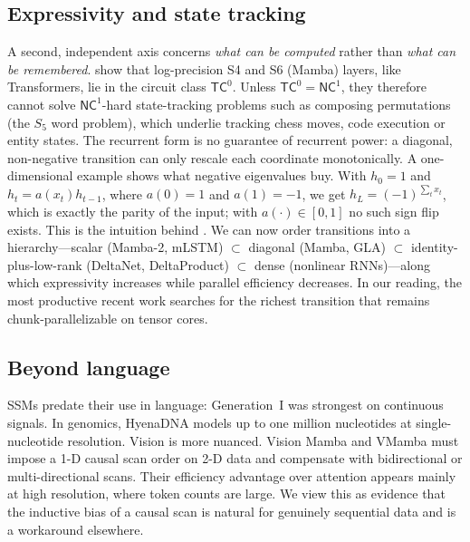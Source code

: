 \documentclass[a4paper]{article}
\theoremstyle{plain}
\theoremstyle{remark}
\begin{document}
\subsection{Expressivity and state tracking}
\label{sec:expressivity}
A second, independent axis concerns \emph{what can be computed} rather than \emph{what can be remembered}. \citet{merrill2024illusion} show that log-precision S4 and S6 (Mamba) layers, like Transformers, lie in the circuit class $\mathsf{TC}^0$. Unless $\mathsf{TC}^0=\mathsf{NC}^1$, they therefore cannot solve $\mathsf{NC}^1$-hard state-tracking problems such as composing permutations (the $S_5$ word problem), which underlie tracking chess moves, code execution or entity states. The recurrent form is no guarantee of recurrent power: a diagonal, non-negative transition can only rescale each coordinate monotonically. A one-dimensional example shows what negative eigenvalues buy. With $h_0=1$ and $h_t=a(x_t)h_{t-1}$, where $a(0)=1$ and $a(1)=-1$, we get $h_L=(-1)^{\sum_tx_t}$, which is exactly the parity of the input; with $a(\cdot)\in[0,1]$ no such sign flip exists. This is the intuition behind \citet{grazzi2025negative}. We can now order transitions into a hierarchy---scalar (Mamba-2, mLSTM) $\subset$ diagonal (Mamba, GLA) $\subset$ identity-plus-low-rank (DeltaNet, DeltaProduct) $\subset$ dense (nonlinear RNNs)---along which expressivity increases while parallel efficiency decreases. In our reading, the most productive recent work searches for the richest transition that remains chunk-parallelizable on tensor cores.

\subsection{Beyond language}
\label{sec:beyond}
SSMs predate their use in language: Generation~I was strongest on continuous signals. In genomics, HyenaDNA \citep{nguyen2023hyenadna} models up to one million nucleotides at single-nucleotide resolution. Vision is more nuanced. Vision Mamba \citep{zhu2024vim} and VMamba \citep{liu2024vmamba} must impose a 1-D causal scan order on 2-D data and compensate with bidirectional or multi-directional scans. Their efficiency advantage over attention appears mainly at high resolution, where token counts are large. We view this as evidence that the inductive bias of a causal scan is natural for genuinely sequential data and is a workaround elsewhere.
\end{document}
